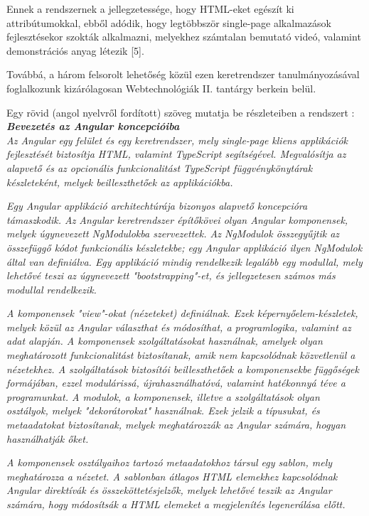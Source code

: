 Ennek a rendszernek a jellegzetessége, hogy HTML-eket egészít ki attribútumokkal, ebből adódik, hogy legtöbbször single-page alkalmazások fejlesztésekor szokták alkalmazni, melyekhez számtalan bemutató videó, valamint demonstrációs anyag létezik [5].

Továbbá, a három felsorolt lehetőség közül ezen keretrendszer tanulmányozásával foglalkozunk kizárólagosan Webtechnológiák II. tantárgy berkein belül.

Egy rövid (angol nyelvről fordított) szöveg mutatja be részleteiben a rendszert \cite{angularcikk}:\\

\noindent\textit{\textbf{\large{Bevezetés az Angular koncepcióiba}}}\\

\textit{Az Angular egy felület és egy keretrendszer, mely single-page kliens applikációk fejlesztését biztosítja HTML, valamint TypeScript segítségével. Megvalósítja az alapvető és az opcionális funkcionalitást TypeScript függvénykönytárak készleteként, melyek beilleszthetőek az applikációkba.}

\textit{Egy Angular applikáció architechtúrája bizonyos alapvető koncepcióra támaszkodik. Az Angular keretrendszer építőkövei olyan Angular komponensek, melyek úgynevezett NgModulokba szervezettek. Az NgModulok összegyűjtik az összefüggő kódot funkcionális készletekbe; egy Angular applikáció ilyen NgModulok által van definiálva. Egy applikáció mindig rendelkezik legalább egy modullal, mely lehetővé teszi az úgynevezett "bootstrapping"-et, és jellegzetesen számos más modullal rendelkezik.}

\textit{A komponensek "view"-okat (nézeteket) definiálnak. Ezek képernyőelem-készletek, melyek közül az Angular választhat és módosíthat, a programlogika, valamint az adat alapján. A komponensek szolgáltatásokat használnak, amelyek olyan meghatározott funkcionalitást biztosítanak, amik nem kapcsolódnak közvetlenül a nézetekhez. A szolgáltatások biztosítói beilleszthetőek a komponensekbe függőségek formájában, ezzel modulárissá, újrahasználhatóvá, valamint hatékonnyá téve a programunkat. A modulok, a komponensek, illetve a szolgáltatások olyan osztályok, melyek "dekorátorokat" használnak. Ezek jelzik a típusukat, és metaadatokat biztosítanak, melyek meghatározzák az Angular számára, hogyan használhatják őket.}


\textit{A komponensek osztályaihoz tartozó metaadatokhoz társul egy sablon, mely meghatározza a nézetet. A sablonban átlagos HTML elemekhez kapcsolódnak Angular direktívák és összeköttetésjelzők, melyek lehetővé teszik az Angular számára, hogy módosítsák a HTML elemeket a megjelenítés legenerálása előtt.}

